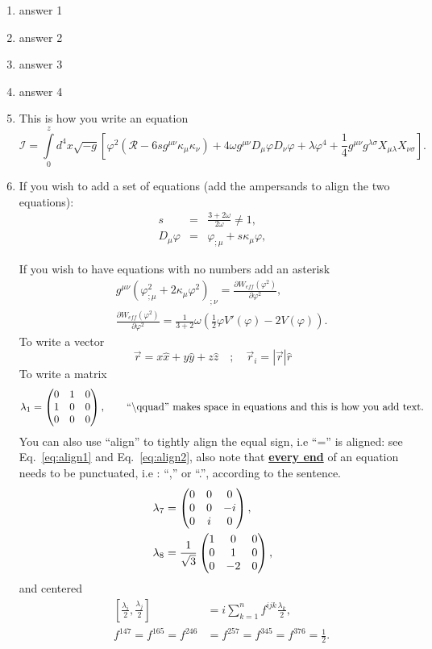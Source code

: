 \documentclass[11pt,fleqn]{article}
\newcommand{\amatrix}[1]{\begin{matrix} #1 \end{matrix}}
\newcommand{\Dn}{\vspace*{3mm}}
\begin{document}
\Dn
\begin{enumerate}
\item answer 1
\item answer 2
\item answer 3
\item answer 4
\item This is how you write an equation
\begin{equation}
\mathcal{I} =\int \limits_0^z  d^4x \sqrt{-g}\left[\varphi^2\left(\mathcal{R}-6sg^{\mu \nu} \kappa_\mu \kappa_\nu\right) + 4 \omega g^{\mu \nu}D_\mu \varphi D_\nu \varphi + \lambda \varphi^4 + \frac{1}{4}g^{\mu \nu} g^{\lambda \sigma}X_{\mu \lambda}X_{\nu \sigma}\right].
\end{equation}

\item If you wish to add a set of equations (add the ampersands to align the two equations):
\begin{eqnarray}
 s &=& \frac{3+2\omega}{2\omega}\neq 1,\\
 D_\mu \varphi &=& \varphi_{;\mu} + s \kappa_\mu \varphi,
\end{eqnarray}

If you wish to have equations with no numbers add an asterisk
\begin{eqnarray*}
&& g^{\mu \nu} \left( \varphi^2_{;\mu} + 2 \kappa_\mu \varphi^2\right)_{;\nu} = \frac{\partial W_{eff}(\varphi^2)}{\partial \varphi^2}, \\
&& \frac{\partial W_{eff}(\varphi^2)}{\partial \varphi^2} = \frac{1}{3+ 2} \omega \left(\frac{1}{2} \varphi V'(\varphi) - 2V(\varphi)\right).
\end{eqnarray*}
To write a vector
\begin{equation}
\vec{r} = x \hat{x} + y \hat{y} + z\hat{z} \quad ; \quad \vec{r}_i
= \left|\vec{r}\right|\hat{r} \end{equation}
To write a matrix
\begin{equation}
\lambda_1 
= \left( \amatrix { 0 & 1 & 0 \cr 1 & 0 & 0 \cr 0 & 0 & 0}\right), \text{\qquad ``\textbackslash qquad'' makes space in equations and this is how you add text.}
\end{equation}
You can also use ``align'' to tightly align the equal sign, i.e ``='' is aligned: see Eq.~\eqref{eq:align1} and Eq.~\eqref{eq:align2},  also note that {\underline{\bf every end}} of an  equation needs to be punctuated, i.e : ``,'' or ``.'', according to the sentence. 
\begin{align}
\lambda_7 
&= \left( \amatrix { 0 & 0 & 0 \cr 0 & 0 & -i \cr 0 & i & 0}\right), \label{eq:align1}\\
 \lambda_8 
&= \frac{1}{\sqrt{3}}\left( \amatrix { 1 & 0 & 0 \cr 0 & 1 & 0 \cr 0 & -2 & 0}\right),\label{eq:align2}
\end{align}
and centered
\begin{align*}
&&\left[\frac{\lambda_i}{2},\frac{\lambda_j}{2}\right] &= i \displaystyle\sum_{k=1}^{n} f^{ijk}\frac{\lambda_k}{2}, \\
&&f^{147}=f^{165}=f^{246}&=f^{257}=f^{345}=f^{376}= \frac{1}{2}.
\end{align*}


\end{enumerate}
\end{document}
